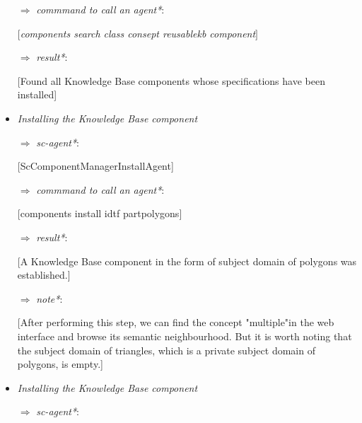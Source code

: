 \documentclass[10pt, a4paper]{article}
\begin{document}
\begin{multicols}{2}
\begin{itemize}
\item[ $\Rightarrow$]
\textit{commmand to call an agent*$:$ }


\vspace{-0.2cm}\textit{$[$components search \textendash \textendash class consept reusable\textunderscore kb component$]$ } 
\vspace{-0.3cm}\item[ $\Rightarrow$]\textit{result*}:


[Found all Knowledge Base components whose specifications have been installed]
\vspace{-0.25cm}\item \textit{Installing the Knowledge Base component}
\itemindent 0.3cm
\item [ $\Rightarrow$]
\vspace{-0.25cm}\textit{sc-agent*}:

\vspace{-0.1cm}[ScComponentManagerInstallAgent]


\item [ $\Rightarrow$]
\vspace{-0.25cm}\textit{commmand to call an agent*}:


\vspace{-0.2cm}[components install \textendash \textendash idtf part\textunderscore polygons]


\item [ $\Rightarrow$]
\vspace{-0.2cm}\textit{result*}:


[A Knowledge Base component in the form of subject domain of polygons was established.]


\item [ $\Rightarrow$]
\vspace{-0.2cm}\textit{note*}:


[After performing this step, we can find the concept "multiple"in the web interface and browse its semantic neighbourhood. But it is worth noting that the subject domain of triangles, which is a private subject domain of polygons, is empty.]
 \vspace{-0.2cm}\item \textit{Installing the Knowledge Base component}
\itemindent 0.3cm\vspace{-0.25cm}\item [ $\Rightarrow$]\textit{sc-agent*}:



\end{itemize}
\end{multicols}
\end{document}
